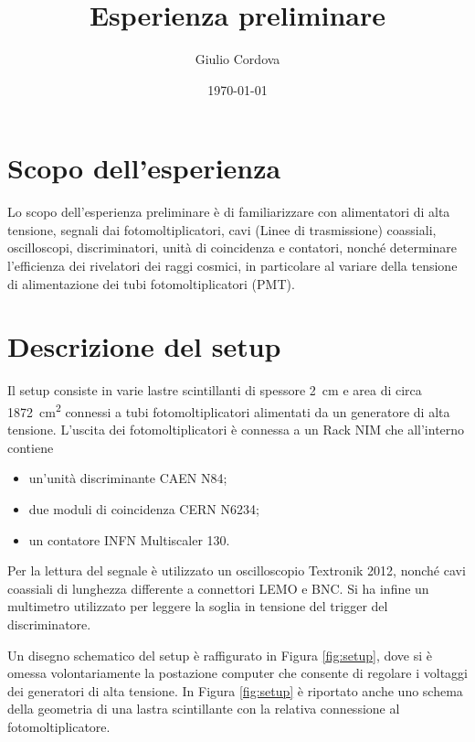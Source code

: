 \documentclass[10pt,a4paper]{article}
\author{Giulio Cordova}
\title{Esperienza preliminare}
\begin{document}
\twocolumn
\date{\today}
\maketitle

\section{Scopo dell'esperienza}

Lo scopo dell'esperienza preliminare è di familiarizzare con alimentatori di alta tensione, segnali dai fotomoltiplicatori, cavi (Linee di trasmissione) coassiali, oscilloscopi, discriminatori, unità di coincidenza e contatori, nonché determinare l'efficienza dei rivelatori dei raggi cosmici, in particolare al variare della tensione di alimentazione dei tubi fotomoltiplicatori (PMT).

\section{Descrizione del setup}

Il setup consiste in varie lastre scintillanti di spessore \SI{2}{\centi\meter} e area di circa \SI{1872}{\centi\meter\squared} connessi a tubi fotomoltiplicatori alimentati da un generatore di alta tensione. L'uscita dei fotomoltiplicatori è connessa a un Rack NIM che all'interno contiene
\begin{itemize}
    \item un'unità discriminante CAEN N84;
    \item due moduli di coincidenza CERN N6234;
    \item un contatore INFN Multiscaler 130.
\end{itemize} 
Per la lettura del segnale è utilizzato un oscilloscopio Textronik 2012, nonché cavi coassiali di lunghezza differente a connettori LEMO e BNC. Si ha infine un multimetro utilizzato per leggere la soglia in tensione del trigger del discriminatore.

Un disegno schematico del setup è raffigurato in Figura \ref{fig:setup}, dove si è omessa volontariamente la postazione computer che consente di regolare i voltaggi dei generatori di alta tensione. In Figura \ref{fig:setup} è riportato anche uno schema della geometria di una lastra scintillante con la relativa connessione al fotomoltiplicatore.
\end{document}
